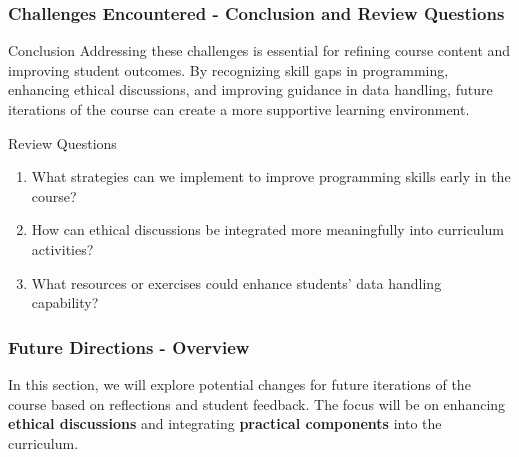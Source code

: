 \documentclass[aspectratio=169]{beamer}
\begin{document}
\begin{frame}[fragile]
    \frametitle{Challenges Encountered - Conclusion and Review Questions}
    \begin{block}{Conclusion}
        Addressing these challenges is essential for refining course content and improving student outcomes. By recognizing skill gaps in programming, enhancing ethical discussions, and improving guidance in data handling, future iterations of the course can create a more supportive learning environment.
    \end{block}

    \begin{block}{Review Questions}
        \begin{enumerate}
            \item What strategies can we implement to improve programming skills early in the course?
            \item How can ethical discussions be integrated more meaningfully into curriculum activities?
            \item What resources or exercises could enhance students' data handling capability?
        \end{enumerate}
    \end{block}
\end{frame}

\begin{frame}[fragile]
    \frametitle{Future Directions - Overview}
    In this section, we will explore potential changes for future iterations of the course based on reflections and student feedback. The focus will be on enhancing \textbf{ethical discussions} and integrating \textbf{practical components} into the curriculum.
\end{frame}
\end{document}
